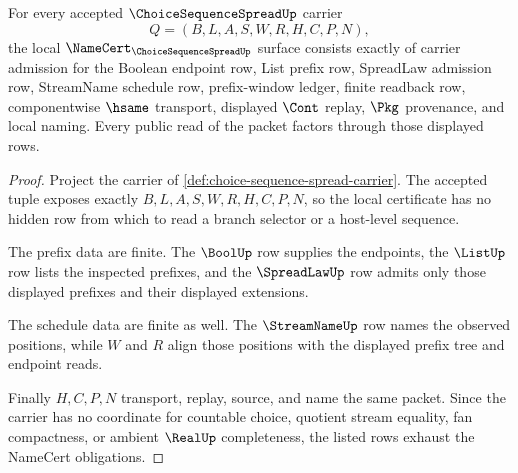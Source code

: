 \begin{theorem}
\label{thm:choice-sequence-spread-namecert-obligations}
For every accepted $\ChoiceSequenceSpreadUp$ carrier
$$
Q=(B,L,A,S,W,R,H,C,P,N),
$$
the local $\NameCert_{\ChoiceSequenceSpreadUp}$ surface consists exactly of
carrier admission for the Boolean endpoint row, List prefix row, SpreadLaw
admission row, StreamName schedule row, prefix-window ledger, finite readback
row, componentwise $\hsame$ transport, displayed $\Cont$ replay, $\Pkg$
provenance, and local naming. Every public read of the packet factors through
those displayed rows.
\end{theorem}
\begin{proof}
Project the carrier of \autoref{def:choice-sequence-spread-carrier}. The
accepted tuple exposes exactly $B,L,A,S,W,R,H,C,P,N$, so the local certificate
has no hidden row from which to read a branch selector or a host-level sequence.

The prefix data are finite. The $\BoolUp$ row supplies the endpoints, the
$\ListUp$ row lists the inspected prefixes, and the $\SpreadLawUp$ row admits
only those displayed prefixes and their displayed extensions.

The schedule data are finite as well. The $\StreamNameUp$ row names the observed
positions, while $W$ and $R$ align those positions with the displayed prefix
tree and endpoint reads.

Finally $H,C,P,N$ transport, replay, source, and name the same packet. Since the
carrier has no coordinate for countable choice, quotient stream equality, fan
compactness, or ambient $\RealUp$ completeness, the listed rows exhaust the
NameCert obligations.
\end{proof}

